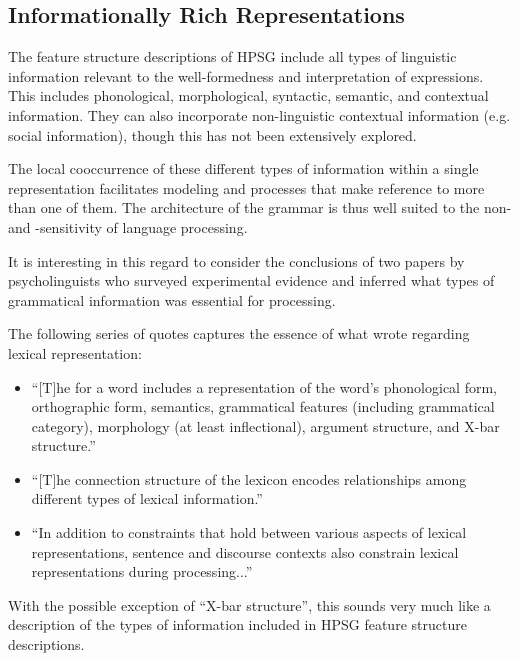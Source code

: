 \documentclass[a4paper]{article}
\begin{document}
\subsection{Informationally Rich Representations}

The feature structure descriptions of HPSG include all types of linguistic information relevant to the well-formedness and interpretation of expressions. This includes phonological, morphological, syntactic, semantic, and contextual information.  They can also incorporate non-linguistic contextual information (e.g. social information), though this has not been extensively explored.

The local cooccurrence of these different types of information within a single representation facilitates modeling  and  processes that make reference to more than one of them.  The architecture of the grammar is thus well suited to the non- and -sensitivity of language processing.  

It is interesting in this regard to consider the conclusions of two papers by psycholinguists who surveyed experimental evidence and inferred what types of grammatical information was essential for processing.  

The following series of quotes captures the essence of what \citet{MPS94a-u} wrote regarding lexical representation:
\begin{itemize} 
\item ``[T]he  for a word includes a representation of the
word's phonological form, orthographic form, semantics,
grammatical features (including grammatical category), morphology
(at least inflectional), argument structure, and X-bar
structure.''
\item ``[T]he connection
structure of the lexicon encodes relationships among
different types of lexical information.''
\item
``In addition to constraints that hold between various aspects
of lexical representations, sentence and discourse contexts also
constrain lexical representations during processing...''
\end{itemize}
With the possible exception of ``X-bar structure'', this sounds very much like a description of the types of information included in HPSG feature structure descriptions.
\end{document}

